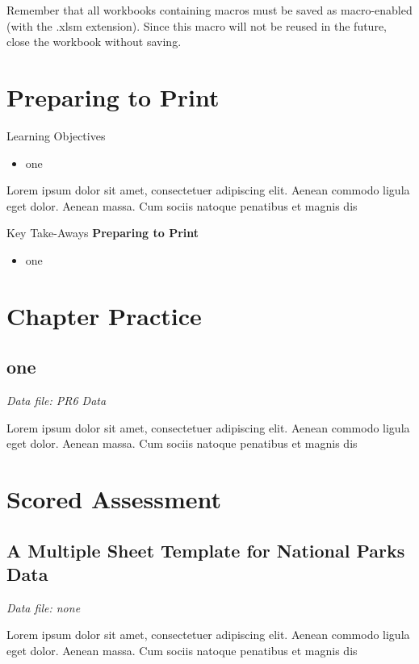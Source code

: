 Remember that all workbooks containing macros must be saved as macro-enabled (with the .xlsm extension). Since this macro will not be reused in the future, close the workbook without saving.


\section{Preparing to Print}

\begin{center}
	\begin{objbox}{Learning Objectives}
		\begin{itemize}
			\setlength{\itemsep}{0pt}
			\setlength{\parskip}{0pt}
			\setlength{\parsep}{0pt}
			
			\item one
			
		\end{itemize}
	\end{objbox}
\end{center}

Lorem ipsum dolor sit amet, consectetuer adipiscing elit. Aenean commodo ligula eget dolor. Aenean massa. Cum sociis natoque penatibus et magnis dis 

\begin{center}
	\begin{tkwbox}{Key Take-Aways}
		\textbf{Preparing to Print}
		\\
		\begin{itemize}
			\setlength{\itemsep}{0pt}
			\setlength{\parskip}{0pt}
			\setlength{\parsep}{0pt}
			
			\item one
			
		\end{itemize}
	\end{tkwbox}
\end{center}

\section{Chapter Practice}

\subsection{one}

\textit{Data file: PR6 Data}

Lorem ipsum dolor sit amet, consectetuer adipiscing elit. Aenean commodo ligula eget dolor. Aenean massa. Cum sociis natoque penatibus et magnis dis 

\section{Scored Assessment}

\subsection{A Multiple Sheet Template for National Parks Data}

\textit{Data file: none}

Lorem ipsum dolor sit amet, consectetuer adipiscing elit. Aenean commodo ligula eget dolor. Aenean massa. Cum sociis natoque penatibus et magnis dis 

